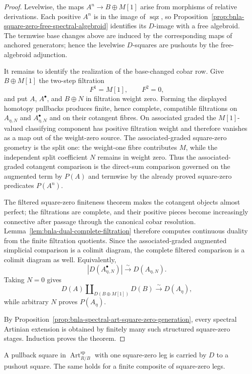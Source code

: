 \begin{proof}
Levelwise, the maps $A^n\to B\oplus M[1]$ arise from morphisms of relative
derivations.  Each positive $A^n$ is in the image of
$\operatorname{sqz}$, so Proposition~\ref{prop:bnla-square-zero-free-spectral-algebroid}
identifies its $D$-image with a free algebroid.  The termwise base changes
above are induced by the corresponding maps of anchored generators; hence the
levelwise $D$-squares are pushouts by the free-algebroid adjunction.

It remains to identify the realization of the base-changed cobar row.  Give
$B\oplus M[1]$ the two-step filtration
\[
    F^1=M[1],\qquad F^2=0,
\]
and put $A$, $A^\bullet$, and $B\oplus N$ in filtration weight zero.  Forming
the displayed homotopy pullbacks produces finite, hence complete, compatible
filtrations on $A_{\eta,N}$ and $A_{\eta,N}^\bullet$ and on their cotangent
fibres.  On associated graded the $M[1]$-valued classifying component has
positive filtration weight and therefore vanishes as a map out of the
weight-zero source.  The associated-graded square-zero geometry is the split
one: the weight-one fibre contributes $M$, while the independent split
coefficient $N$ remains in weight zero.  Thus the associated-graded
cotangent comparison is the direct-sum comparison governed on the augmented
term by $P(A)$ and termwise by the already proved square-zero predicates
$P(A^n)$.

The filtered square-zero finiteness theorem makes the cotangent objects
almost perfect; the filtrations are complete, and their positive pieces
become increasingly connective after passage through the canonical cobar
resolution.  Lemma~\ref{lem:bnla-dual-complete-filtration} therefore computes
continuous duality from the finite filtration quotients.  Since the
associated-graded augmented simplicial comparison is a colimit diagram, the
complete filtered comparison is a colimit diagram as well.  Equivalently,
\[
\boxed{
    \left|D(A_{\eta,N}^\bullet)\right|
    \xrightarrow{\sim}
    D(A_{\eta,N}).}
\]
Taking $N=0$ gives
\[
    D(A)
    \amalg_{D(B\oplus M[1])}
    D(B)
    \xrightarrow{\sim}
    D(A_\eta),
\]
while arbitrary $N$ proves $P(A_\eta)$.

By Proposition~\ref{prop:bnla-spectral-art-square-zero-generation}, every
spectral Artinian extension is obtained by finitely many such structured
square-zero stages.  Induction proves the theorem.
\end{proof}

\begin{corollary}
\label{cor:bnla-spectral-D-finite-excision}
A pullback square in $\operatorname{Art}^{\mathrm{sp}}_{R/B}$ with one
square-zero leg is carried by $D$ to a pushout square.  The same holds for a
finite composite of square-zero legs.
\end{corollary}

